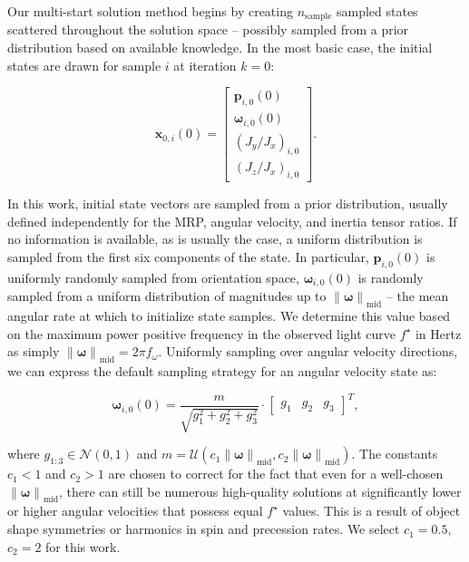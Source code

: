 \documentclass[a4paper,twocolumn]{spaceDebrisC} %
\newcommand{\vctr}[1]{\bm{#1}}
\newcommand{\norm}[1]{\left\lVert#1\right\rVert}
\begin{document}
Our multi-start solution method begins by creating $n_\text{sample}$ sampled states scattered throughout the solution space -- possibly sampled from a prior distribution based on available knowledge. In the most basic case, the initial states are drawn for sample $i$ at iteration $k=0$:

\begin{equation}
 \vctr{x}_{0,i}(0) = \begin{bmatrix}\vctr{p}_{i,0}(0) \\ \vctr{\omega}_{i,0}(0) \\ \left(J_y / J_x\right)_{i,0} \\ \left(J_z / J_x\right)_{i,0}\end{bmatrix}.
\end{equation}

In this work, initial state vectors are sampled from a prior distribution, usually defined independently for the MRP, angular velocity, and inertia tensor ratios. If no information is available, as is usually the case, a uniform distribution is sampled from the first six components of the state. In particular, $\vctr{p}_{i,0}(0)$ is uniformly randomly sampled from orientation space, $\vctr{\omega}_{i,0}(0)$ is randomly sampled from a uniform distribution of magnitudes up to $\norm{\vctr{\omega}}_\text{mid}$ -- the mean angular rate at which to initialize state samples. We determine this value based on the maximum power positive frequency in the observed light curve $f^\star$ in Hertz as simply $\norm{\vctr{\omega}}_\text{mid} = 2\pi f_\omega$. Uniformly sampling over angular velocity directions, we can express the default sampling strategy for an angular velocity state as:

\begin{equation} \label{eq:omega_sampler}
 \vctr{\omega}_{i,0}(0) = \frac{m}{\sqrt{g_1^2+g_2^2+g_3^2}} \cdot \begin{bmatrix} g_1 & g_2 & g_3 \end{bmatrix}^T,
\end{equation}

\noindent
where $g_{1:3} \in \mathcal{N}(0,1)$ and $m=\mathcal{U}(c_1 \norm{\vctr{\omega}}_\text{mid}, c_2 \norm{\vctr{\omega}}_\text{mid})$. The constants $c_1<1$ and $c_2>1$ are chosen to correct for the fact that even for a well-chosen $\norm{\vctr{\omega}}_\text{mid}$, there can still be numerous high-quality solutions at significantly lower or higher angular velocities that possess equal $f^\star$ values. This is a result of object shape symmetries or harmonics in spin and precession rates. We select $c_1=0.5$, $c_2=2$ for this work.
\end{document}
